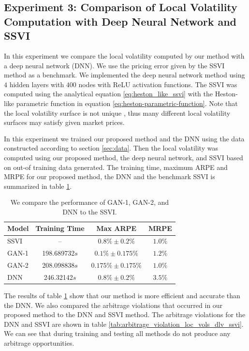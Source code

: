 \documentclass{article}
\theoremstyle{plain}%
\theoremstyle{definition}
\theoremstyle{remark}
\begin{document}
\subsection{Experiment 3: Comparison of Local Volatility Computation with Deep Neural Network and SSVI}
In this experiment we compare the local volatility computed by our method with a deep neural network (DNN). We use the pricing error given by the SSVI method \citep{gatheral-2014} as a benchmark. We implemented the deep neural network method using $4$ hidden layers with $400$ nodes with ReLU activation functions. The SSVI was computed using the analytical equation \eqref{eq:heston_like_ssvi} with the Heston-like parametric function in equation \eqref{eq:heston-parametric-function}. Note that the local volatility surface is not unique \citep{lee-2002}, thus many different local volatility surfaces may satisfy given market prices.

In this experiment we trained our proposed method and the DNN using the data constructed according to section \ref{sec:data}. Then the local volatility was computed using our proposed method, the deep neural network, and SSVI based on out-of training data generated. The training time, maximum ARPE and MRPE for our proposed method, the DNN and the benchmark SSVI is summarized in table \ref{tab:paper3_model_performance}.

\begin{table}[htbp]
\centering
\caption{We compare the performance of GAN-1, GAN-2, and DNN to the SSVI.}
\begin{tabular}{lccc}
\hline
\textbf{Model} & \textbf{Training Time} & \textbf{Max ARPE} & \textbf{MRPE} \\
\hline
SSVI & -- & $0.8\%\pm 0.2\%$ & $1.0\%$\\
GAN-1 & 198.689732$s$ & $0.1\%\pm 0.175\%$ & $1.2\%$\\
GAN-2 & 208.098838$s$ & $0.175\%\pm 0.175\%$ & $1.0\%$\\
DNN & 246.32142$s$ & $0.8\%\pm 0.2\%$ & $3.5\%$\\
\hline
\end{tabular}
\label{tab:paper3_model_performance}
\end{table}

The results of table \ref{tab:paper3_model_performance} show that our method is more efficient and accurate than the DNN. We also compared the arbitrage violations that occurred in our proposed method to the DNN and SSVI method. The arbitrage violations for the DNN and SSVI are shown in table \ref{tab:arbitrage_violation_loc_vols_dlv_ssvi}. We can see that during training and testing all methods do not produce any arbitrage opportunities. 
\end{document}

